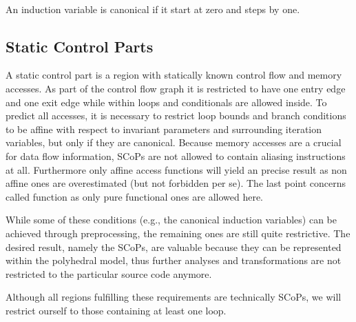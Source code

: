 \begin{definition} ~\\
  An induction variable is canonical if it start at zero and steps by one.
  \label{def:CanonicalInductionVariable}
\end{definition}

\subsection{Static Control Parts}
A static control part is a region with statically known control flow and memory
accesses. As part of the control flow graph it is restricted to have one entry
edge and one exit edge while within loops and conditionals are allowed inside.
To predict all accesses, it is necessary to restrict loop bounds and branch 
conditions to be affine with respect to invariant parameters 
and surrounding iteration variables, but only if they are canonical. 
Because memory accesses are a crucial for data flow information,
SCoPs are not allowed to contain aliasing instructions at all. 
Furthermore only affine access functions will yield an precise result as 
non affine ones are overestimated (but not forbidden per se).
The last point concerns called function as only pure functional ones are allowed
here.

While some of these conditions (e.g., the canonical induction variables) 
can be achieved through preprocessing, the remaining ones are still 
quite restrictive. The desired result, namely the SCoPs, are valuable because
they can be represented within the polyhedral model, thus further analyses and
transformations are not restricted to the particular source code anymore.

Although all regions fulfilling these requirements are
technically SCoPs, we will restrict ourself to those containing at least one loop.

